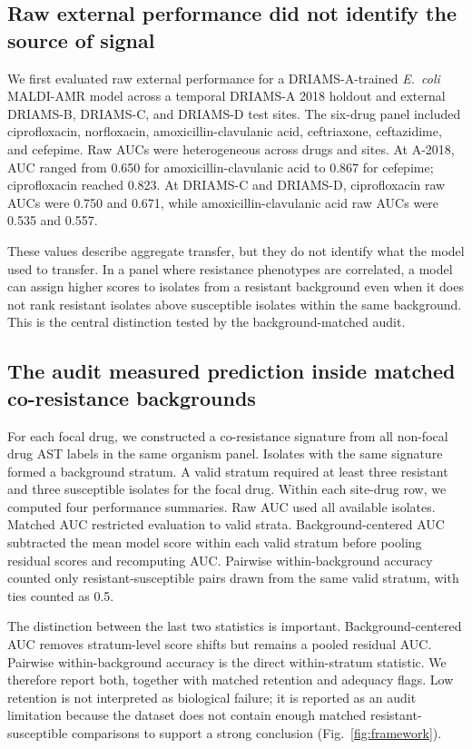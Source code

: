 \documentclass[11pt]{article}
\begin{document}
\subsection*{Raw external performance did not identify the source of signal}

We first evaluated raw external performance for a DRIAMS-A-trained \textit{E.~coli} MALDI-AMR model across a temporal DRIAMS-A 2018 holdout and external DRIAMS-B, DRIAMS-C, and DRIAMS-D test sites. The six-drug panel included ciprofloxacin, norfloxacin, amoxicillin-clavulanic acid, ceftriaxone, ceftazidime, and cefepime. Raw AUCs were heterogeneous across drugs and sites. At A-2018, AUC ranged from 0.650 for amoxicillin-clavulanic acid to 0.867 for cefepime; ciprofloxacin reached 0.823. At DRIAMS-C and DRIAMS-D, ciprofloxacin raw AUCs were 0.750 and 0.671, while amoxicillin-clavulanic acid raw AUCs were 0.535 and 0.557.

These values describe aggregate transfer, but they do not identify what the model used to transfer. In a panel where resistance phenotypes are correlated, a model can assign higher scores to isolates from a resistant background even when it does not rank resistant isolates above susceptible isolates within the same background. This is the central distinction tested by the background-matched audit.

\subsection*{The audit measured prediction inside matched co-resistance backgrounds}

For each focal drug, we constructed a co-resistance signature from all non-focal drug AST labels in the same organism panel. Isolates with the same signature formed a background stratum. A valid stratum required at least three resistant and three susceptible isolates for the focal drug. Within each site-drug row, we computed four performance summaries. Raw AUC used all available isolates. Matched AUC restricted evaluation to valid strata. Background-centered AUC subtracted the mean model score within each valid stratum before pooling residual scores and recomputing AUC. Pairwise within-background accuracy counted only resistant-susceptible pairs drawn from the same valid stratum, with ties counted as 0.5.

The distinction between the last two statistics is important. Background-centered AUC removes stratum-level score shifts but remains a pooled residual AUC. Pairwise within-background accuracy is the direct within-stratum statistic. We therefore report both, together with matched retention and adequacy flags. Low retention is not interpreted as biological failure; it is reported as an audit limitation because the dataset does not contain enough matched resistant-susceptible comparisons to support a strong conclusion (Fig.~\ref{fig:framework}).
\end{document}
